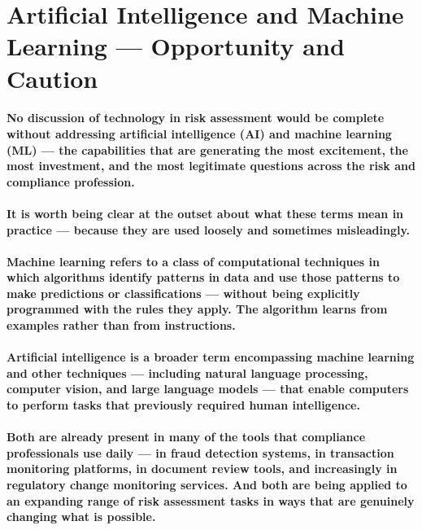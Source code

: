 \section{Artificial Intelligence and Machine Learning — Opportunity and Caution}
\paragraph{No discussion of technology in risk assessment would be complete without addressing \textbf{artificial intelligence (AI)} and \textbf{machine learning (ML)} — the capabilities that are generating the most excitement, the most investment, and the most legitimate questions across the risk and compliance profession.}
\paragraph{It is worth being clear at the outset about what these terms mean in practice — because they are used loosely and sometimes misleadingly.}
\paragraph{\textbf{Machine learning} refers to a class of computational techniques in which algorithms identify patterns in data and use those patterns to make predictions or classifications — without being explicitly programmed with the rules they apply. The algorithm learns from examples rather than from instructions.}
\paragraph{\textbf{Artificial intelligence} is a broader term encompassing machine learning and other techniques — including natural language processing, computer vision, and large language models — that enable computers to perform tasks that previously required human intelligence.}
\paragraph{Both are already present in many of the tools that compliance professionals use daily — in fraud detection systems, in transaction monitoring platforms, in document review tools, and increasingly in regulatory change monitoring services. And both are being applied to an expanding range of risk assessment tasks in ways that are genuinely changing what is possible.}

